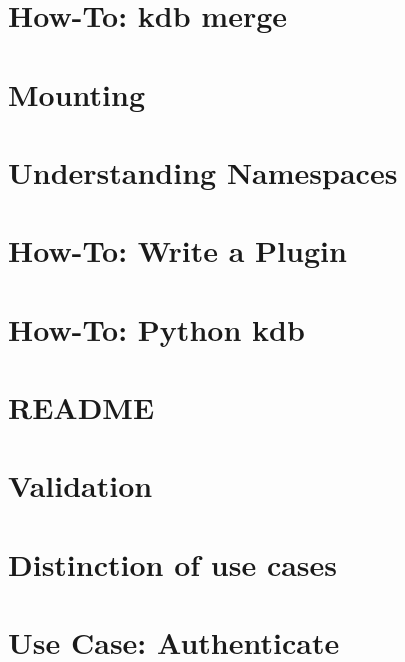 \documentclass[twoside]{book}
\newcommand{\+}{\discretionary{\mbox{\scriptsize$\hookleftarrow$}}{}{}}
\begin{document}
\chapter{How-\/\+To\+: kdb merge}
\label{doc_tutorials_merge_md}
\hypertarget{doc_tutorials_merge_md}{}

\chapter{Mounting}
\label{doc_tutorials_mount_md}
\hypertarget{doc_tutorials_mount_md}{}

\chapter{Understanding Namespaces}
\label{doc_tutorials_namespaces_md}
\hypertarget{doc_tutorials_namespaces_md}{}

\chapter{How-\/\+To\+: Write a Plugin}
\label{doc_tutorials_plugins_md}
\hypertarget{doc_tutorials_plugins_md}{}

\chapter{How-\/\+To\+: Python kdb}
\label{doc_tutorials_python-kdb_md}
\hypertarget{doc_tutorials_python-kdb_md}{}

\chapter{R\+E\+A\+D\+M\+E}
\label{md_doc_tutorials_README}
\hypertarget{md_doc_tutorials_README}{}

\chapter{Validation}
\label{doc_tutorials_validation_md}
\hypertarget{doc_tutorials_validation_md}{}

\chapter{Distinction of use cases}
\label{doc_usecases_snippet_sharing_distinction_use_cases_md}
\hypertarget{doc_usecases_snippet_sharing_distinction_use_cases_md}{}

\chapter{Use Case\+: Authenticate}
\label{md_doc_usecases_snippet_sharing_UC_authenticate}
\hypertarget{md_doc_usecases_snippet_sharing_UC_authenticate}{}

\end{document}
